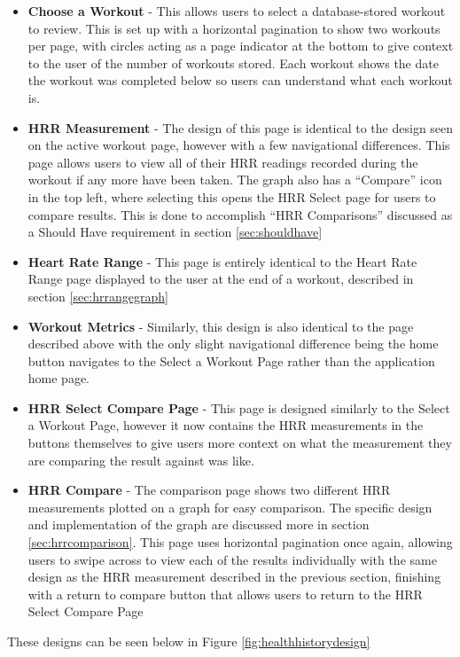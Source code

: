 \documentclass{l4proj}
\begin{document}
\begin{itemize}
    \item \textbf{Choose a Workout} - This allows users to select a database-stored workout to review. This is set up with a horizontal pagination to show two workouts per page, with circles acting as a page indicator at the bottom to give context to the user of the number of workouts stored. Each workout shows the date the workout was completed below so users can understand what each workout is.
    \item \textbf{HRR Measurement} - The design of this page is identical to the design seen on the active workout page, however with a few navigational differences. This page allows users to view all of their HRR readings recorded during the workout if any more have been taken. The graph also has a “Compare” icon in the top left, where selecting this opens the HRR Select page for users to compare results. This is done to accomplish “HRR Comparisons” discussed as a Should Have requirement in section \ref{sec:shouldhave}
    \item \textbf{Heart Rate Range} - This page is entirely identical to the Heart Rate Range page displayed to the user at the end of a workout, described in section \ref{sec:hrrangegraph}
    \item \textbf{Workout Metrics} - Similarly, this design is also identical to the page described above with the only slight navigational difference being the home button navigates to the Select a Workout Page rather than the application home page.
    \item \textbf{HRR Select Compare Page} - This page is designed similarly to the Select a Workout Page, however it now contains the HRR measurements in the buttons themselves to give users more context on what the measurement they are comparing the result against was like.
    \item \textbf{HRR Compare} - The comparison page shows two different HRR measurements plotted on a graph for easy comparison. The specific design and implementation of the graph are discussed more in section \ref{sec:hrrcomparison}. This page uses horizontal pagination once again, allowing users to swipe across to view each of the results individually with the same design as the HRR measurement described in the previous section, finishing with a return to compare button that allows users to return to the  HRR Select Compare Page
\end{itemize}

These designs can be seen below in Figure \ref{fig:healthhistorydesign}
\end{document}
